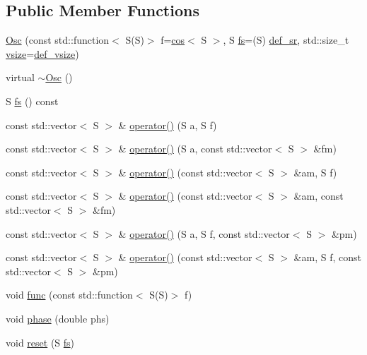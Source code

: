 \subsection*{Public Member Functions}
\begin{DoxyCompactItemize}
\item 
\hyperlink{class_aurora_1_1_osc_aca573068f8919635cfca278c7b087e38}{Osc} (const std\+::function$<$ S(S)$>$ f=\hyperlink{namespace_aurora_ab6ef1b966b8f27d107fcabe1027a677a}{cos}$<$ S $>$, S \hyperlink{class_aurora_1_1_osc_a9ac3aa9006fc98588b2163e0e56f6e30}{fs}=(S) \hyperlink{namespace_aurora_ad49263d809bea98dd422e95bc91bc03e}{def\+\_\+sr}, std\+::size\+\_\+t \hyperlink{class_aurora_1_1_snd_base_af9e21aaf411b17f7a8221c991ce5d291}{vsize}=\hyperlink{namespace_aurora_afaaddf667a06e7ce23c667a8b7295263}{def\+\_\+vsize})
\item 
virtual \hyperlink{class_aurora_1_1_osc_a95062ac1670f5de00a27c33bfb4eb117}{$\sim$\+Osc} ()
\item 
S \hyperlink{class_aurora_1_1_osc_a9ac3aa9006fc98588b2163e0e56f6e30}{fs} () const
\item 
const std\+::vector$<$ S $>$ \& \hyperlink{class_aurora_1_1_osc_a2a36c0afda86b6fabad4ed3ca0f510af}{operator()} (S a, S f)
\item 
const std\+::vector$<$ S $>$ \& \hyperlink{class_aurora_1_1_osc_af48611ef63363221de325d8976a1ec56}{operator()} (S a, const std\+::vector$<$ S $>$ \&fm)
\item 
const std\+::vector$<$ S $>$ \& \hyperlink{class_aurora_1_1_osc_a28fe97e5634b8a02474657ed456c326b}{operator()} (const std\+::vector$<$ S $>$ \&am, S f)
\item 
const std\+::vector$<$ S $>$ \& \hyperlink{class_aurora_1_1_osc_a06f9ead5fbf828f7ebb8617ac6cb24b4}{operator()} (const std\+::vector$<$ S $>$ \&am, const std\+::vector$<$ S $>$ \&fm)
\item 
const std\+::vector$<$ S $>$ \& \hyperlink{class_aurora_1_1_osc_a21019c4df8f4cf26af9fc50ac0c9f336}{operator()} (S a, S f, const std\+::vector$<$ S $>$ \&pm)
\item 
const std\+::vector$<$ S $>$ \& \hyperlink{class_aurora_1_1_osc_a6a8967d1e19757d77521e5b64842f7e3}{operator()} (const std\+::vector$<$ S $>$ \&am, S f, const std\+::vector$<$ S $>$ \&pm)
\item 
void \hyperlink{class_aurora_1_1_osc_a47029d701edea820aba145788b6f5bb6}{func} (const std\+::function$<$ S(S)$>$ f)
\item 
void \hyperlink{class_aurora_1_1_osc_a5828ab7fc7bddc7d8f4e349844f220b3}{phase} (double phs)
\item 
void \hyperlink{class_aurora_1_1_osc_a74abc44400ec00c9ff1dad13cdb24000}{reset} (S \hyperlink{class_aurora_1_1_osc_a9ac3aa9006fc98588b2163e0e56f6e30}{fs})
\end{DoxyCompactItemize}



